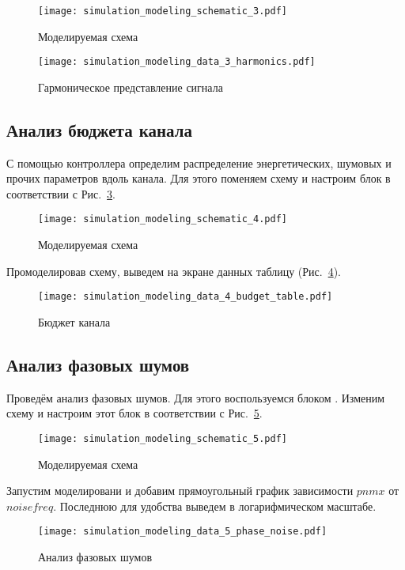 \begin{figure}[!ht]
    \centering
    \texttt{[image: simulation\_modeling\_schematic\_3.pdf]}
    \caption{Моделируемая схема}%
    \label{fig:simulation_modeling_schematic_3}
\end{figure}

\begin{figure}[!ht]
    \centering
    \texttt{[image: simulation\_modeling\_data\_3\_harmonics.pdf]}
    \caption{Гармоническое представление сигнала}%
    \label{fig:simulation_modeling_data_3_harmonics}
\end{figure}

\subsection{Анализ бюджета канала}

С помощью контроллера  определим распределение энергетических, шумовых и прочих параметров вдоль канала.
Для этого поменяем схему и настроим блок  в соответствии с Рис.~\ref{fig:simulation_modeling_schematic_4}.

\begin{figure}[!ht]
    \centering
    \texttt{[image: simulation\_modeling\_schematic\_4.pdf]}
    \caption{Моделируемая схема}%
    \label{fig:simulation_modeling_schematic_4}
\end{figure}

Промоделировав схему, выведем на экране данных таблицу (Рис.~\ref{fig:simulation_modeling_data_4_budget_table}).

\begin{figure}[!ht]
    \centering
    \texttt{[image: simulation\_modeling\_data\_4\_budget\_table.pdf]}
    \caption{Бюджет канала}%
    \label{fig:simulation_modeling_data_4_budget_table}
\end{figure}

\subsection{Анализ фазовых шумов}

Проведём анализ фазовых шумов.
Для этого воспользуемся блоком .
Изменим схему и настроим этот блок в соответствии с Рис.~\ref{fig:simulation_modeling_schematic_5}.

\begin{figure}[!ht]
    \centering
    \texttt{[image: simulation\_modeling\_schematic\_5.pdf]}
    \caption{Моделируемая схема}%
    \label{fig:simulation_modeling_schematic_5}
\end{figure}

Запустим моделировани и добавим прямоугольный график зависимости $pnmx$ от $noisefreq$.
Последнюю для удобства выведем в логарифмическом масштабе.

\begin{figure}[!ht]
    \centering
    \texttt{[image: simulation\_modeling\_data\_5\_phase\_noise.pdf]}
    \caption{Анализ фазовых шумов}%
    \label{fig:simulation_modeling_data_5_phase_noise}
\end{figure}
